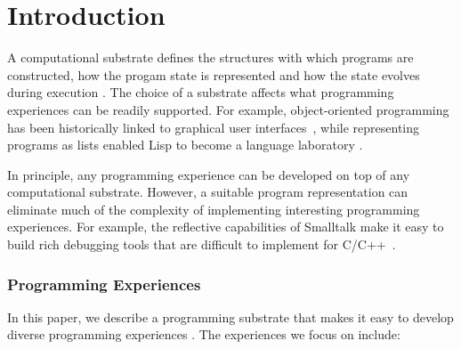 \documentclass[sigconf,anonymous,screen]{acmart}
\begin{document}

\section{Introduction}

A computational substrate defines the structures with which programs are constructed, how
the progam state is represented and how the state evolves during execution \cite{jakubovic-2022-ladder}.
The choice of a substrate affects what programming experiences can be readily supported.
For example, object-oriented programming has been historically linked to graphical user
interfaces~\cite{kay-1993-smalltalk}, while representing programs as lists enabled Lisp to become
a language laboratory \cite{steele-1993-lisp}.

In principle, any programming experience can be developed on top of any computational
substrate. However, a suitable program representation can eliminate much of the complexity of implementing interesting
programming experiences. For example, the reflective capabilities of Smalltalk make it easy
to build rich debugging tools \cite{rauch-2019-babylonian} that are difficult to implement
for C/C++~\cite{kell-2018-unix,kell-2024-debugging}.

\subsubsection*{Programming Experiences}

In this paper, we describe a programming substrate that makes it easy to develop diverse
programming experiences \cite{myers-2006-eup}. The experiences we focus on include:
\end{document}
